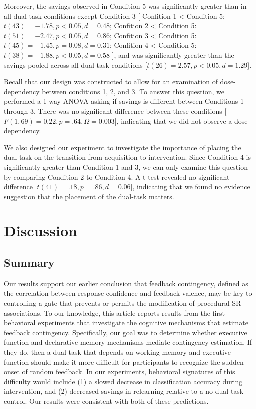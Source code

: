 \documentclass[apacite,draftfirst,man]{apa6}
\begin{document}
Moreover, the savings observed in Condition 5 was significantly greater than in
all dual-task conditions except Condition 3
[
Confition 1 < Condition 5: $t(43) = -1.78, p < 0.05, d = 0.48$;
Confition 2 < Condition 5: $t(51) = -2.47, p < 0.05, d = 0.86$;
Confition 3 < Condition 5: $t(45) = -1.45, p = 0.08, d = 0.31$;
Confition 4 < Condition 5: $t(38) = -1.88, p < 0.05, d = 0.58$
], and was significantly greater than the savings pooled across all dual-task
conditions [$t(26) = 2.57, p < 0.05, d = 1.29$].

Recall that our design was constructed to allow for an examination of
dose-dependency between conditions 1, 2, and 3. To answer this question, we
performed a 1-way ANOVA asking if savings is different between Conditions 1
through 3. There was no significant difference between these conditions
[$F(1,69) = 0.22, p = .64, \Omega = 0.003$], indicating that we did not observe
a dose-dependency.

We also designed our experiment to investigate the importance of placing the
dual-task on the transition from acquisition to intervention. Since Condition 4
is significantly greater than Condition 1 and 3, we can only examine this
question by comparing Condition 2 to Condition 4. A t-test revealed no
significant difference [$t(41) = .18, p = .86, d = 0.06$], indicating that we
found no evidence suggestion that the placement of the dual-task matters.

\section*{Discussion}
\subsection*{Summary}
Our results support our earlier conclusion \cite{crossley_erasing_2013} that
feedback contingency, defined as the correlation between response confidence and
feedback valence, may be key to controlling a gate that prevents or permits the
modification of procedural SR associations. To our knowledge, this article
reports results from the first behavioral experiments that investigate the
cognitive mechanisms that estimate feedback contingency. Specifically, our goal
was to determine whether executive function and declarative memory mechanisms
mediate contingency estimation. If they do, then a dual task that depends on
working memory and executive function should make it more difficult for
participants to recognize the sudden onset of random feedback. In our
experiments, behavioral signatures of this difficulty would include (1) a slowed
decrease in classification accuracy during intervention, and (2) decreased
savings in relearning relative to a no dual-task control. Our results were
consistent with both of these predictions.
\end{document}
